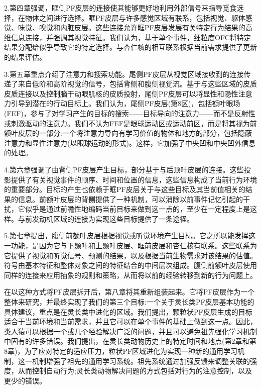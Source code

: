\par 
2.第四章强调，眶侧PF皮层的连接使其能够更好地利用外部信号来指导觅食选择，在物体之间进行选择。眶PF皮层与许多感觉区域有联系，包括视觉、躯体感觉、味觉、嗅觉和内脏皮层。这些连接允许眶PF皮层发展有关特定行为结果的高维信息连接，并强调其视觉特征。我们认为，基于单个事件，细粒度OFC将特定结果分配给似乎导致它的特定选择。与杏仁核的相互联系根据当前需求提供了更新的结果评估。
\par 
3.第五章重点介绍了注意力和搜索功能。尾侧PF皮层从视觉区域接收到的连接传递了来自低阶和高阶视觉的信号，包括背侧和腹侧视觉流。基于与这些区域的皮质皮质连接以及控制脑干动眼肌核的皮质投射，尾侧PF皮层可以将显性和隐性注意力引导到潜在的行动目标上。我们认为，尾侧PF皮层(第8区)，包括额叶眼场(FEF)，参与了对学习产生的目标的搜索——目标导向的注意力——而不是反射性或刺激驱动的注意力。我们不认为FEF是眼球运动区或运动前区，而是将其视为前额叶皮层的一部分:一个将注意力导向有学习价值的物体和地方的部分，包括隐蔽注意力和显性注意力(以眼球运动的形式)。这样，它加强了中央凹和中央凹外信息的处理。
\par 
4.第六章强调了由背侧PF皮层产生目标，部分基于与后顶叶皮层的连接。这些投影提供了有关视觉事件的顺序、时间和位置的信息，这些信息构成了当前行为环境的重要部分。目标的产生也依赖于眶PF皮层关于与这些目标及其当前值相关的结果的信息。前额叶皮层的背侧提供了一种机制，可以消除以前事件记忆引起的干扰，它似乎是通过前瞻性地编码当前目标来做到这一点的，至少在一定程度上是这样。与前发动机区域的连接为实现这些目标提供了一条途径。
\par 
5.第七章提出，腹侧前额叶皮层根据视觉或听觉环境产生目标。它之所以能发挥这一功能，是因为它与下颞叶和上颞叶皮层、眶前皮层和杏仁核有联系。这些联系为它提供了视觉和听觉信号、预测的结果，以及根据当前生物需求对该结果的估值。符号由基本特征和整体对象之间的特征结合的中间层次组成。腹侧前额叶皮层使用同样的连接来应用抽象的规则和策略，从而将以前的经验转移到新的行为问题上。
\par 
在以这种方式将PF皮层拆开后，第八章将其重新组装起来。它将PF皮层作为一个整体来研究，并最终实现了我们的第三个目标:一个关于灵长类PF皮层基本功能的具体建议，重点是在灵长类中进化的区域。我们提出，颗粒状PF皮层生成的目标适合于当前环境和当前需求，并且它可以在单个事件的基础上做到这一点。因此，类人猿可以根据一个或几个经验解决广泛的问题，并且可以避免祖先强化学习机制中固有的许多错误。我们提出，在灵长类动物历史上的特定时间和地点(第2章和第8章)，为了应对特定的适应压力，粒状PF区域进化为实现一种新的通用学习机制，这一机制增强了祖先的通用学习系统。祖先系统通过加强反馈来调整关联的强度，从而控制自动行为;灵长类动物解决问题的方式包括对行为的注意控制，以及更少的错误。
\par 
